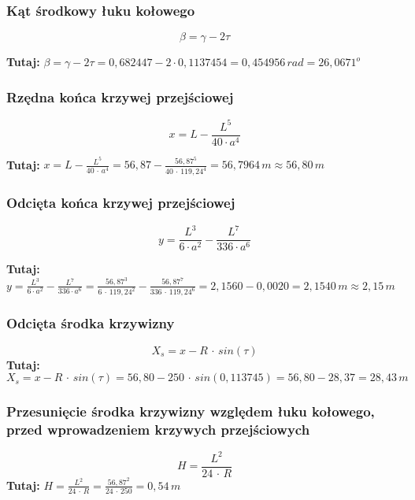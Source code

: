 \documentclass[12pt]{article}
\begin{document}
        \subsubsection{Kąt środkowy łuku kołowego}
                \begin{equation}
                    \beta = \gamma - 2\tau 
                \end{equation}

                \textbf{Tutaj:} \( \beta = \gamma - 2\tau = 0,682447 - 2 \cdot 0,1137454 = 0,454956\,rad = 26,0671^{o} \)
        
        \subsubsection{Rzędna końca krzywej przejściowej}
                \begin{equation}
                    x = L - \frac{L^{5}}{40 \cdot a^{4} }
                \end{equation}

                \textbf{Tutaj:} \( x = L - \frac{ L^{5} }{ 40 \,\cdot\, a^{4} } = 56,87 - \frac{56,87^{5}}{40 \,\cdot\, 119,24^{4}} = 56,7964\,m \approx 56,80\,m \)
                \newpage
        \subsubsection{Odcięta końca krzywej przejściowej}
                \begin{equation}
                    y = \frac{L^{3}}{6 \cdot a^{2}} - \frac{L^{7}}{336 \cdot a^{6}} 
                \end{equation}

                \textbf{Tutaj:} \( y = \frac{L^{3}}{6 \cdot a^{2}} - \frac{L^{7}}{336 \cdot a^{6}}
                = \frac{56,87^{3}}{6 \,\cdot\, 119,24^{2}} - \frac{56,87^{7}}{336 \,\cdot\, 119,24^{6}}
                = 2,1560-0,0020 = 2,1540\,m \approx 2,15\,m \)
        \subsubsection{Odcięta środka krzywizny}
            \begin{equation}
                X_{s} = x - R \,\cdot\, sin(\tau)
            \end{equation}
            \textbf{Tutaj:} \( X_{s} = x - R \,\cdot\, sin(\tau) 
            = 56,80 - 250 \,\cdot\, sin(0,113745) = 56,80 - 28,37 = 28,43\,m \)

        \subsubsection{Przesunięcie środka krzywizny względem łuku kołowego,\\ przed wprowadzeniem krzywych przejściowych} 
            \begin{equation}
                H = \frac{L^{2}}{24 \,\cdot\, R}
            \end{equation}
            \textbf{Tutaj:} \( H = \frac{L^{2}}{24 \,\cdot\, R} = \frac{56,87^{2}}{24 \,\cdot\, 250}=0,54\,m\)
\end{document}
